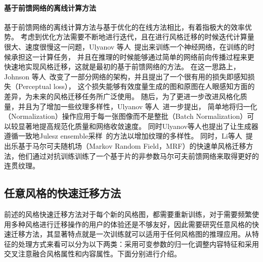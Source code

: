 \paragraph{基于前馈网络的离线计算方法}
基于前馈网络的离线计算方法与基于优化的在线方法相比，有着指极大的效率优势。
考虑到优化方法需要不断地进行迭代，且在进行风格迁移的时候迭代计算量很大、速度很慢这一问题，Ulyanov 等人~\cite{ulyanov2016texture}提出来训练一个神经网络，在训练的时候承担这一计算任务，
并且在推理的时候能够通过简单的网络前向传播过程来更快速地实现风格迁移，这就是最初的基于前馈网络的方法。
在这一思路上，Johnson 等人~\cite{johnson2016perceptual}改变了一部分网络的架构，并且提出了一个很有用的损失即感知损失（Perceptual loss），
这个损失能够有效度量生成的图和原图在人眼感知方面的差异，为未来的风格迁移任务所广泛使用。
随后，为了更进一步改进风格化质量，并且为了增加一些纹理多样性，Ulyanov 等人~\cite{ulyanov2017improved}进一步提出，
简单地将归一化（Normalization）操作应用于每一张图像而不是整批（Batch Normalization）可以较显著地提高规范化质量和网络收敛速度。
同时Ulyanov等人也提出了让生成器遵循一致地Julesz ensemble采样~\cite{zhu2000exploring}的方法以增加纹理的多样性。
同时，Li等人~\cite{li2016precomputed}提出乐基于马尔可夫随机场（Markov Random Field，MRF）的快速单风格迁移方法，他们通过对抗训练训练了一个基于片的非参数马尔可夫前馈网络来取得更好的连贯纹理。

\subsection{任意风格的快速迁移方法}
前述的风格快速迁移方法对于每个新的风格图，都需要重新训练，对于需要频繁使用多种风格进行迁移操作的用户的体验还是不够友好，因此需要研究任意风格的快速迁移方法，其显著特点就是一次训练就可以适用于任何风格图的推理应用。从特征的处理方式来看可以分为以下两类：采用可变参数的归一化调整内容特征和采用交叉注意融合风格属性和内容属性。下面分别进行介绍。
